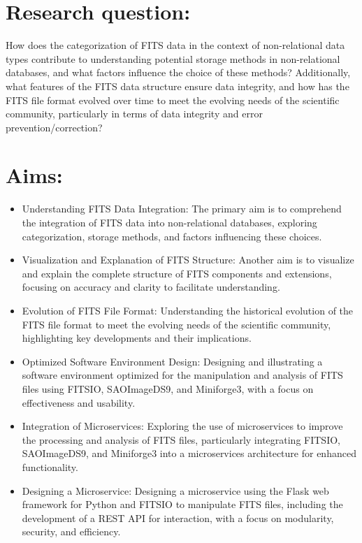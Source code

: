 \documentclass[a4paper,oneside,11pt]{book}
\begin{document}
\section{Research question:}
How does the categorization of FITS data in the context of non-relational data types contribute to understanding potential storage methods in non-relational databases, and what factors influence the choice of these methods? Additionally, what features of the FITS data structure ensure data integrity, and how has the FITS file format evolved over time to meet the evolving needs of the scientific community, particularly in terms of data integrity and error prevention/correction?
\section{Aims:}
\begin{itemize}
    \item Understanding FITS Data Integration: The primary aim is to comprehend the integration of FITS  data into non-relational databases, exploring categorization, storage methods, and factors influencing these choices.
    \item Visualization and Explanation of FITS Structure: Another aim is to visualize and explain the complete structure of FITS components and extensions, focusing on accuracy and clarity to facilitate understanding.
    \item Evolution of FITS File Format: Understanding the historical evolution of the FITS file format to meet the evolving needs of the scientific community, highlighting key developments and their implications.
    \item Optimized Software Environment Design: Designing and illustrating a software environment optimized for the manipulation and analysis of FITS files using FITSIO, SAOImageDS9, and Miniforge3, with a focus on effectiveness and usability.
    \item Integration of Microservices: Exploring the use of microservices to improve the processing and analysis of FITS files, particularly integrating FITSIO, SAOImageDS9, and Miniforge3 into a microservices architecture for enhanced functionality.
    \item Designing a Microservice: Designing a microservice using the Flask web framework for Python and FITSIO to manipulate FITS files, including the development of a REST API for interaction, with a focus on modularity, security, and efficiency.
\end{itemize}
\end{document}
